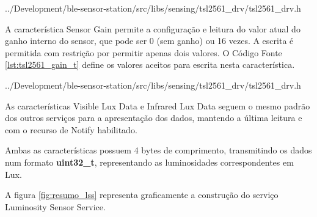 \begin{minipage}{0.95\linewidth}

{../Development/ble-sensor-station/src/libs/sensing/tsl2561_drv/tsl2561_drv.h}
\end{minipage}

A característica Sensor Gain permite a configuração e leitura do valor atual do
ganho interno do sensor, que pode ser 0 (sem ganho) ou 16 vezes. A escrita é
permitida com restrição por permitir apenas dois valores. O Código Fonte
\ref{lst:tsl2561_gain_t} define os valores aceitos para escrita nesta
característica.

\begin{minipage}{0.95\linewidth} 

{../Development/ble-sensor-station/src/libs/sensing/tsl2561_drv/tsl2561_drv.h}
\end{minipage}

As características Visible Lux Data e Infrared Lux Data seguem o mesmo padrão
dos outros serviços para a apresentação dos dados, mantendo a última leitura e
com o recurso de Notify habilitado.

Ambas as características possuem 4 bytes de comprimento, transmitindo os dados
num formato \textbf{uint32\_t}, representando as luminosidades correspondentes
em Lux.

A figura \ref{fig:resumo_lss} representa graficamente a construção do serviço
Luminosity Sensor Service.


